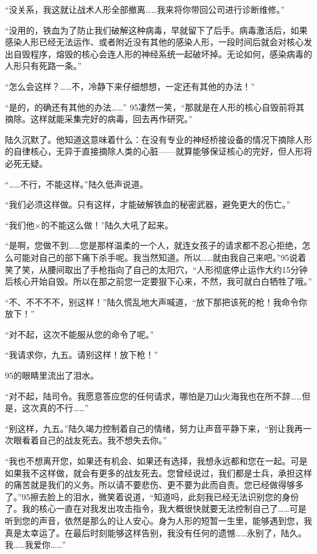 “没关系，我这就让战术人形全部撤离……我来将你带回公司进行诊断维修。”

“没用的，铁血为了防止我们破解这种病毒，早就留下了后手。病毒激活后，如果感染人形已经无法运作、或者附近没有其他的感染人形，一段时间后就会对核心发出自毁程序，熔毁的核心会连人形的神经系统一起破坏掉。无论如何，感染病毒的人形只有死路一条。”

“怎么会这样？……不，冷静下来仔细想想，一定还有其他的办法！”

“是的，的确还有其他的办法……” 95凄然一笑，“那就是在人形的核心自毁前将其摘除。这样就能采集完好的病毒，回去再作研究。” 

陆久沉默了。他知道这意味着什么：在没有专业的神经桥接设备的情况下摘除人形的自律核心，无异于直接摘除人类的心脏——就算能够保证核心的完好，但人形将必死无疑。

“……不行，不能这样。”陆久低声说道。

“我们必须这样做。只有这样，才能破解铁血的秘密武器，避免更大的伤亡。”

“我们他$\times$的不能这么做！”陆久大吼了起来。

“是啊，您做不到……您是那样温柔的一个人，就连女孩子的请求都不忍心拒绝，怎么可能对自己的部下痛下杀手呢。我当然知道。所以……就由我自己来吧。”95说着笑了笑，从腰间取出了手枪指向了自己的太阳穴，“人形彻底停止运作大约15分钟后核心开始自毁。所以在那之前您一定要狠下心来，不然，我可就白白牺牲了哦。”

“不、不不不不，别这样！”陆久慌乱地大声喊道，“放下那把该死的枪！我命令你放下！”

“对不起，这次不能服从您的命令了呢。”

“我请求你，九五。请别这样！放下枪！”

95的眼睛里流出了泪水。

“对不起，陆司令。我愿意答应您的任何请求，哪怕是刀山火海我也在所不辞……但是，这次真的不行……”

“别这样，九五。”陆久竭力控制着自己的情绪，努力让声音平静下来，“别让我再一次眼看着自己的战友死去。我不想失去你。”

“我也不想离开您，如果还有机会、如果还有选择，我想永远都和您在一起。可是如果我不这样做，就会有更多的战友死去。您曾经说过，我们都是士兵，承担这样的痛苦就是我们的义务。所以请不要悲伤、更不要为此而自责。您已经做得够多了。”95擦去脸上的泪水，微笑着说道，“知道吗，此刻我已经无法识别您的身份了。我的核心一直在对我发出攻击指令，我大概很快就要无法控制自己了……可是听到您的声音，依然是那么的让人安心。身为人形的短暂一生里，能够遇到您，我真是太幸运了。在最后时刻能够这样告别，我没有任何的遗憾……永别了，陆久。我……我爱你……”

